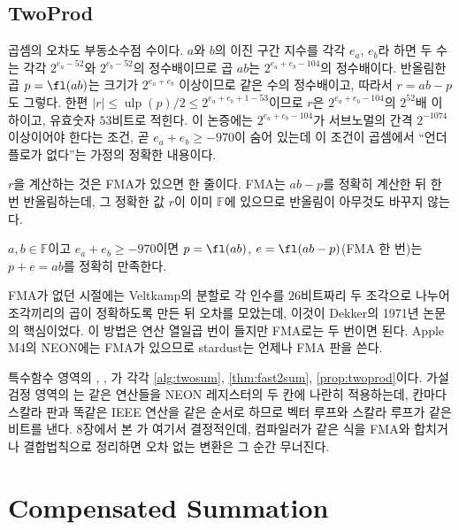 \subsection{TwoProd}

곱셈의 오차도 부동소수점 수이다. $a$와 $b$의 이진 구간 지수를 각각 $e_a$, $e_b$라 하면 두 수는 각각 $2^{e_a-52}$와 $2^{e_b-52}$의 정수배이므로 곱 $ab$는 $2^{e_a+e_b-104}$의 정수배이다. 반올림한 곱 $p=\fl(ab)$는 크기가 $2^{e_a+e_b}$ 이상이므로 같은 수의 정수배이고, 따라서 $r=ab-p$도 그렇다. 한편 $|r|\le\operatorname{ulp}(p)/2\le2^{e_a+e_b+1-53}$이므로 $r$은 $2^{e_a+e_b-104}$의 $2^{52}$배 이하이고, 유효숫자 $53$비트로 적힌다. 이 논증에는 $2^{e_a+e_b-104}$가 서브노멀의 간격 $2^{-1074}$ 이상이어야 한다는 조건, 곧 $e_a+e_b\ge-970$이 숨어 있는데 이 조건이 곱셈에서 ``언더플로가 없다''는 가정의 정확한 내용이다.

$r$을 계산하는 것은 FMA가 있으면 한 줄이다. FMA는 $ab-p$를 정확히 계산한 뒤 한 번 반올림하는데, 그 정확한 값 $r$이 이미 $\mathbb F$에 있으므로 반올림이 아무것도 바꾸지 않는다.

\begin{proposition}[TwoProd]
\label{prop:twoprod}
$a,b\in\mathbb F$이고 $e_a+e_b\ge-970$이면 $p=\fl(ab)$, $e=\fl(ab-p)$(FMA 한 번)는 $p+e=ab$를 정확히 만족한다.
\end{proposition}

FMA가 없던 시절에는 Veltkamp의 분할로 각 인수를 $26$비트짜리 두 조각으로 나누어 조각끼리의 곱이 정확하도록 만든 뒤 오차를 모았는데, 이것이 Dekker의 1971년 논문의 핵심이었다\cite{dekker1971}. 이 방법은 연산 열일곱 번이 들지만 FMA로는 두 번이면 된다. Apple M4의 NEON에는 FMA가 있으므로 stardust는 언제나 FMA 판을 쓴다.

\begin{instardust}
특수함수 영역의 , , 가 각각 \cref{alg:twosum}, \cref{thm:fast2sum}, \cref{prop:twoprod}이다. 가설검정 영역의 는 같은 연산들을 NEON 레지스터의 두 칸에 나란히 적용하는데, 칸마다 스칼라 판과 똑같은 IEEE 연산을 같은 순서로 하므로 벡터 루프와 스칼라 루프가 같은 비트를 낸다. 8장에서 본 가 여기서 결정적인데, 컴파일러가  같은 식을 FMA와 합치거나 결합법칙으로 정리하면 오차 없는 변환은 그 순간 무너진다.
\end{instardust}

\section{Compensated Summation}
\label{sec:compensated}

